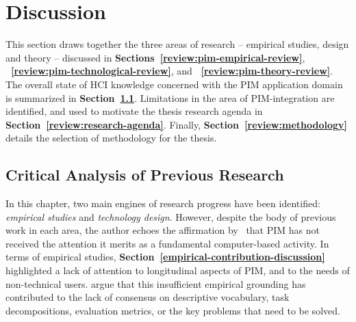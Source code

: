\newpage
\section{Discussion} %
\label{review:discussion}

This section draws together the three areas of research -- empirical studies, design and theory -- discussed in \textbf{Sections~\ref{review:pim-empirical-review}}, \textbf{~\ref{review:pim-technological-review}}, and \textbf{~\ref{review:pim-theory-review}}.  The overall state of HCI knowledge concerned with the PIM application domain is summarized in \textbf{Section~\ref{review:discussion:critical-analysis}}.  Limitations in the area of PIM-integration are identified, and used to motivate the thesis research agenda in \textbf{Section~\ref{review:research-agenda}}.  Finally, \textbf{Section~\ref{review:methodology}} details the selection of methodology for the thesis.


\subsection{Critical Analysis of Previous Research}
\label{review:discussion:critical-analysis}
In this chapter, two main engines of research progress have been identified: \textit{empirical studies} and \textit{technology design}. However, despite the body of previous work in each area, the author echoes the affirmation by~\citep{Whittaker-rta:00} that PIM has not received the attention it merits as a fundamental computer-based activity.  In terms of empirical studies, \textbf{Section~\ref{empirical-contribution-discussion}} highlighted a lack of attention to longitudinal aspects of PIM, and to the needs of non-technical users.  \citet{Whittaker-rta:00} argue that this insufficient empirical grounding has contributed to the lack of consensus on descriptive vocabulary, task decompositions, evaluation metrics, or the key problems that need to be solved.  

